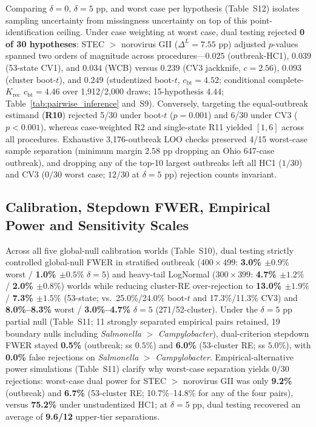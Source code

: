 Comparing $\delta = 0$, $\delta = 5\text{ pp}$, and worst case per hypothesis (Table~S12) isolates sampling uncertainty from missingness uncertainty on top of this point-identification ceiling. Under case weighting at worst case, dual testing rejected \textbf{0 of 30 hypotheses}: STEC $>$ norovirus GII ($\Delta^L = 7.55\text{ pp}$) adjusted $p$-values spanned two orders of magnitude across procedures---$0.025$ (outbreak-HC1), $0.039$ (53-state CV1), and $0.034$ (WCB) versus $0.239$ (CV3 jackknife, $c=2.56$), $0.093$ (cluster boot-$t$), and $0.249$ (studentized boot-$t$, $c_{\text{bt}}=4.52$; conditional complete-$K_{\text{rec}}$ $c_{\text{bt}}=4.46$ over 1,912/2,000 draws; 15-hypothesis $4.44$; Table~\ref{tab:pairwise_inference} and~S9). Conversely, targeting the equal-outbreak estimand (\textbf{R10}) rejected 5/30 under boot-$t$ ($p = 0.001$) and 6/30 under CV3 ($p < 0.001$), whereas case-weighted R2 and single-state R11 yielded $[1, 6]$ across all procedures. Exhaustive 3,176-outbreak LOO checks preserved 4/15 worst-case sample separation (minimum margin $2.58\text{ pp}$ dropping an Ohio 647-case outbreak), and dropping any of the top-10 largest outbreaks left all HC1 ($1/30$) and CV3 ($0/30$ worst case; $12/30$ at $\delta = 5\text{ pp}$) rejection counts invariant.




\subsection{Calibration, Stepdown FWER, Empirical Power and Sensitivity Scales}\label{sec:res-sensitivity}

Across all five global-null calibration worlds (Table~S10), dual testing strictly controlled global-null FWER in stratified outbreak ($400 \times 499$: \textbf{3.0\% $\pm 0.9\%$} worst / \textbf{1.0\% $\pm 0.5\%$} $\delta=5$) and heavy-tail LogNormal ($300 \times 399$: \textbf{4.7\% $\pm 1.2\%$} / \textbf{2.0\% $\pm 0.8\%$}) worlds while reducing cluster-RE over-rejection to \textbf{13.0\% $\pm 1.9\%$} / \textbf{7.3\% $\pm 1.5\%$} (53-state; vs.\ 25.0\%/24.0\% boot-$t$ and 17.3\%/11.3\% CV3) and \textbf{8.0\%--8.3\%} worst / \textbf{3.0\%--4.7\%} $\delta = 5$ (271/52-cluster). Under the $\delta = 5\text{ pp}$ partial null (Table~S11; 11 strongly separated empirical pairs retained, 19 boundary nulls including \textit{Salmonella} $>$ \textit{Campylobacter}), dual-criterion stepdown FWER stayed \textbf{0.5\%} (outbreak; ss $0.5\%$) and \textbf{6.0\%} (53-cluster RE; ss $5.0\%$), with \textbf{0.0\%} false rejections on \textit{Salmonella} $>$ \textit{Campylobacter}. Empirical-alternative power simulations (Table~S11) clarify why worst-case separation yields $0/30$ rejections: worst-case dual power for STEC $>$ norovirus GII was only \textbf{9.2\%} (outbreak) and \textbf{6.7\%} (53-cluster RE; 10.7\%--14.8\% for any of the four pairs), versus \textbf{75.2\%} under unstudentized HC1; at $\delta = 5\text{ pp}$, dual testing recovered an average of \textbf{9.6/12} upper-tier separations.

